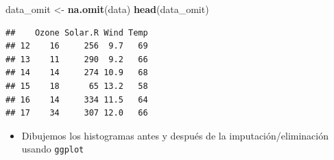 \documentclass[
]{book}
\newenvironment{Shaded}{\begin{snugshade}}{\end{snugshade}}
\newcommand{\FunctionTok}[1]{\textcolor[rgb]{0.13,0.29,0.53}{\textbf{#1}}}
\newcommand{\NormalTok}[1]{#1}
\newcommand{\OtherTok}[1]{\textcolor[rgb]{0.56,0.35,0.01}{#1}}
\providecommand{\tightlist}{%
  \setlength{\itemsep}{0pt}\setlength{\parskip}{0pt}}
\begin{document}
\begin{Shaded}
\begin{Highlighting}[]
\NormalTok{data\_omit }\OtherTok{\textless{}{-}} \FunctionTok{na.omit}\NormalTok{(data)}
\FunctionTok{head}\NormalTok{(data\_omit)}
\end{Highlighting}
\end{Shaded}

\begin{verbatim}
##    Ozone Solar.R Wind Temp
## 12    16     256  9.7   69
## 13    11     290  9.2   66
## 14    14     274 10.9   68
## 15    18      65 13.2   58
## 16    14     334 11.5   64
## 17    34     307 12.0   66
\end{verbatim}

\begin{itemize}
\tightlist
\item
  Dibujemos los histogramas antes y después de la imputación/eliminación usando \texttt{ggplot}
\end{itemize}
\end{document}
